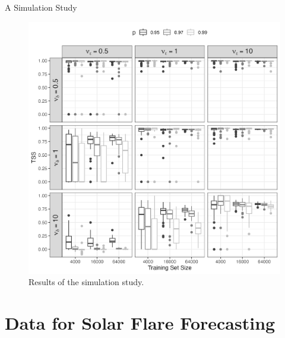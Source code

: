\documentclass{beamer}
\begin{document}
\begin{frame}{A Simulation Study}
    \begin{figure}[h!]
        \centering
        \includegraphics[scale=0.4]{sim_study07.png}
        \caption{Results of the simulation study.}
        \label{fig:sim_study07}
    \end{figure}
\end{frame}

\section{Data for Solar Flare Forecasting}
\end{document}
